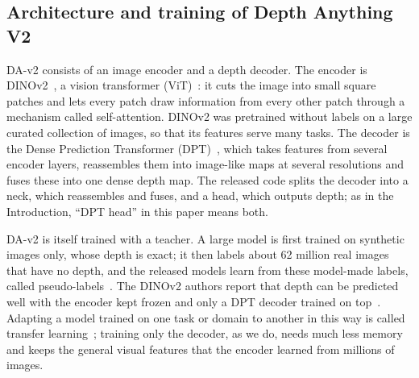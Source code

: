 \subsection{Architecture and training of Depth Anything V2}
\mbox{DA-v2} consists of an image encoder and a depth decoder. The encoder is DINOv2~\cite{dinov2}, a vision transformer
(ViT)~\cite{vit}: it cuts the image into small square patches and lets every patch draw information from every other
patch through a mechanism called self-attention. DINOv2 was pretrained without labels on a large curated collection of
images, so that its features serve many tasks. The decoder is the Dense Prediction Transformer (DPT)~\cite{dpt}, which
takes features from several encoder layers, reassembles them into image-like maps at several resolutions and fuses
these into one dense depth map. The released code splits the decoder into a neck, which reassembles and fuses, and a
head, which outputs depth; as in the Introduction, ``DPT head'' in this paper means both.

\mbox{DA-v2} is itself trained with a teacher. A large model is first trained on synthetic images only, whose depth is exact;
it then labels about 62 million real images that have no depth, and the released models learn from these model-made
labels, called pseudo-labels~\cite{da2}. The DINOv2 authors report that depth can be predicted well with the encoder
kept frozen and only a DPT decoder trained on top~\cite{dinov2}. Adapting a model trained on one task or domain to
another in this way is called transfer learning~\cite{yosinski}; training only the decoder, as we do, needs much less
memory and keeps the general visual features that the encoder learned from millions of images.

